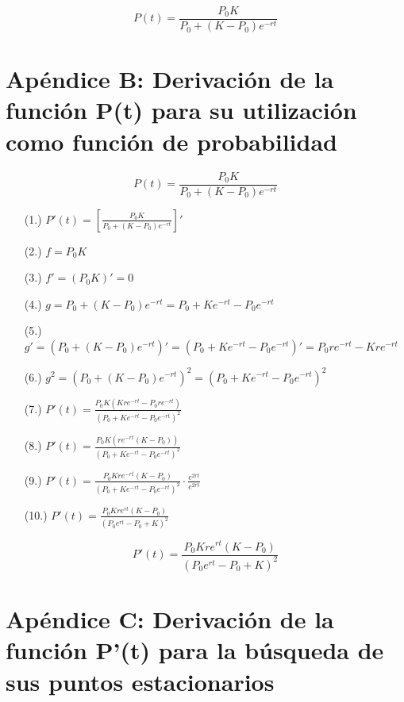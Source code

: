 \begin{equation*}
\boxed{P(t) = \displaystyle\frac{P_0 K}{P_0 + (K-P_0)e^{-rt}}}
\end{equation*}

\section{Ap\'endice B: Derivaci\'on de la funci\'on P(t) para su utilizaci\'on como funci\'on de probabilidad}
\label{app-b}

\begin{equation*}
\boxed{P(t) = \displaystyle\frac{P_0 K}{P_0 + (K-P_0)e^{-rt}}}
\end{equation*}

\begin{enumerate}
\item [(1.)] $P'(t) = \left[\displaystyle\frac{P_0 K}{P_0 + (K-P_0)e^{-rt}}\right]'$
\item [(2.)] $f = P_0 K $
\item [(3.)] $f' = (P_0 K)' = 0$
\item [(4.)] $g = P_0 + (K-P_0)e^{-rt} = P_0 + K e^{-rt} - P_0 e^{-rt}$
\item [(5.)] $g' = (P_0 + (K-P_0)e^{-rt})' = (P_0 + K e^{-rt} - P_0 e^{-rt})' = P_0 r e^{-rt} - K r e^{-rt}$
\item [(6.)] $g^2 = (P_0 + (K-P_0)e^{-rt})^2 = (P_0 + K e^{-rt} - P_0 e^{-rt})^2$
\item [(7.)] $P'(t) = \displaystyle\frac{P_0 K(K r e^{-rt} - P_0 r e^{-rt})}{(P_0 + K e^{-rt} - P_0 e^{-rt})^2}$
\item [(8.)] $P'(t) = \displaystyle\frac{P_0 K(r e^{-rt}(K - P_0))}{(P_0 + K e^{-rt} - P_0 e^{-rt})^2}$
\item [(9.)] $P'(t) = \displaystyle\frac{P_0 K r e^{-rt}(K - P_0)}{(P_0 + K e^{-rt} - P_0 e^{-rt})^2} \cdot \displaystyle\frac{e^{2rt}}{e^{2rt}}$
\item [(10.)] $P'(t) = \displaystyle\frac{P_0 K r e^{rt}(K - P_0)}{(P_0 e^{rt} - P_0 + K)^2}$
\end{enumerate}

\begin{equation*}
\boxed{P'(t) = \displaystyle\frac{P_0 K r e^{rt}(K-P_0)}{(P_0 e^{rt} - P_0 + K)^2}}
\end{equation*}

\section{Ap\'endice C: Derivaci\'on de la funci\'on P'(t) para la b\'usqueda de sus puntos estacionarios}
\label{app-c}

